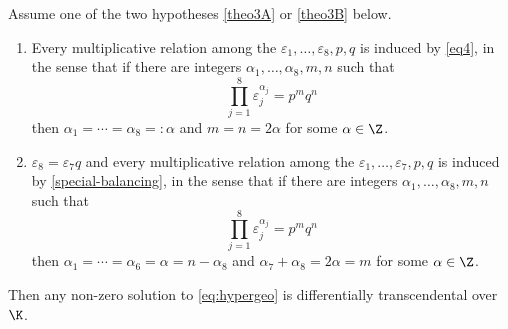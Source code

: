 \begin{theo}\label{theo3} Assume one of the two hypotheses \eqref{theo3A} or \eqref{theo3B} below.

\begin{enumerate}\renewcommand{\theenumi}{\Alph{enumi}}
\item\label{theo3A}
Every multiplicative relation among the $\varepsilon_{1},\dots,\varepsilon_{8},p,q$ is induced by \eqref{eq4}, in the sense that if there are integers $\alpha_{1},\dots,\alpha_{8},m,n$ such that
\[
\prod_{j=1}^{8}\varepsilon_{j}^{\alpha_{j}} =p^{m}q^{n}
\]
then $\alpha_{1}=\cdots=\alpha_{8}=:\alpha$ and $m=n=2\alpha$ for some $\alpha\in \Z$.

\item\label{theo3B}
$\varepsilon_8=\varepsilon_7q$ and every multiplicative relation among the $\varepsilon_{1},\dots,\varepsilon_{7},p,q$ is induced by \eqref{special-balancing}, in the sense that if there are integers $\alpha_{1},\dots,\alpha_{8},m,n$ such that
\[
\prod_{j=1}^{8}\varepsilon_{j}^{\alpha_{j}} =p^{m}q^{n}
\]
then $\alpha_{1}=\cdots=\alpha_{6}=\alpha=n-\alpha_8$ and $\alpha_7+\alpha_8=2\alpha=m$ for some $\alpha\in \Z$.
\end{enumerate}
Then any non-zero solution to \eqref{eq:hypergeo} is differentially transcendental over~$\K$.
\end{theo}


